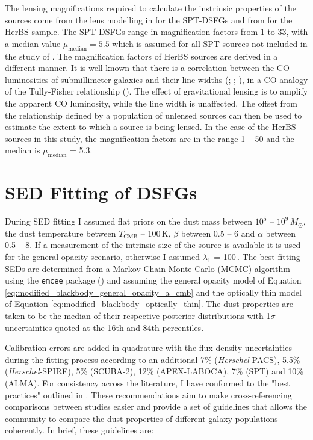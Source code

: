 The lensing magnifications required to calculate the instrinsic properties of the sources come from the lens modelling in \citealt{Spilker_2016} for the SPT-DSFGs and from \citealt{Urquhart_2022} for the HerBS sample. The SPT-DSFGs range in magnification factors from 1 to 33, with a median value $\mu_{\textrm{median}} = 5.5$ which is assumed for all SPT sources not included in the study of \citealt{Spilker_2016}. The magnification factors of HerBS sources are derived in a different manner. It is well known that there is a correlation between the CO luminosities of submillimeter galaxies and their line widths (\citealt{Bothwell_2013}; \citealt{Dannerbauer_2017}; \citealt{Neri_2020}), in a CO analogy of the Tully-Fisher relationship (\citealt{Tully_1977}). The effect of gravitational lensing is to amplify the apparent CO luminosity, while the line width is unaffected. The offset from the relationship defined by a population of unlensed sources can then be used to estimate the extent to which a source is being lensed. In the case of the HerBS sources in this study, the magnification factors are in the range 1 -- 50 and the median is $\mu_{\textrm{median}}$ = 5.3.

\section{SED Fitting of DSFGs}

During SED fitting I assumed flat priors on the dust mass between $10^5$ -- $10^9\,M_\odot$, the dust temperature between $T_{\textrm{CMB}}$ -- 100\,K, $\beta$ between 0.5 -- 6 and $\alpha$ between 0.5 -- 8. If a measurement of the intrinsic size of the source is available it is used for the general opacity scenario, otherwise I assumed $\lambda_1$ = 100\,\micron. The best fitting SEDs are determined from a Markov Chain Monte Carlo (MCMC) algorithm using the \texttt{emcee} package (\citealt{Foreman-Mackey_2013}) and assuming the general opacity model of Equation \ref{eq:modified_blackbody_general_opacity_a_cmb} and the optically thin model of Equation \ref{eq:modified_blackbody_optically_thin}. The dust properties are taken to be the median of their respective posterior distributions with 1$\sigma$ uncertainties quoted at the 16th and 84th percentiles. 

Calibration errors are added in quadrature with the flux density uncertainties during the fitting process according to an additional 7\% (\textit{Herschel}-PACS), 5.5\% (\textit{Herschel}-SPIRE), 5\% (SCUBA-2), 12\% (APEX-LABOCA), 7\% (SPT) and 10\% (ALMA). For consistency across the literature, I have conformed to the "best practices" outlined in \citealt{Drew_2022}. These recommendations aim to make cross-referencing comparisons between studies easier and provide a set of guidelines that allows the community to compare the dust properties of different galaxy populations coherently. In brief, these guidelines are: 

